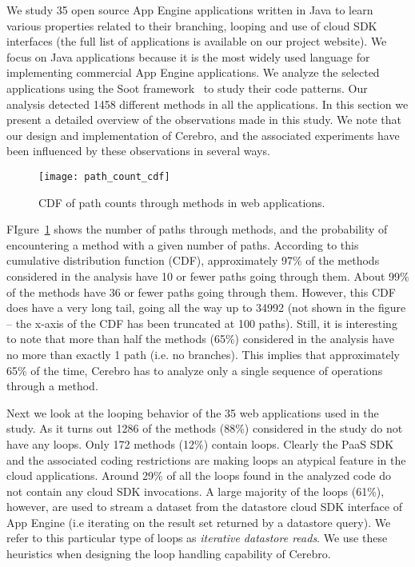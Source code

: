 We study 35 open source App Engine applications written in Java to learn 
various properties related to their branching, looping and use of cloud SDK interfaces (the full list
of applications is available on our project website). We focus on
Java applications because it is the most widely used language for implementing
commercial App Engine applications. 
We analyze the selected applications
using the Soot framework~\cite{Vallee-Rai:2010:SJB:1925805.1925818} to study their code patterns. 
Our analysis detected 1458 different methods in all the
applications. In this section we present a detailed overview of the observations made in this study. We note that
our design and implementation of Cerebro, and the associated experiments have been influenced by 
these observations in several ways.

\begin{figure}
\centering
\texttt{[image: path\_count\_cdf]}
\caption{CDF of path counts through methods in web applications.}
\label{fig:path_count_cdf}
\end{figure}

FIgure~\ref{fig:path_count_cdf} shows the number of paths through methods, and the probability of encountering
a method with a given number of paths. According to this cumulative distribution function (CDF), 
approximately 97\% of the methods considered in the analysis have 10 or fewer paths going through them. About 99\% of 
the methods have 36 or fewer paths going through them. However, this CDF does have a very long tail, going all the way
up to 34992 (not shown in the figure -- the x-axis of the CDF has been truncated at 100 paths). Still, it is interesting to note that more
than half the methods (65\%) considered in the analysis have no more than exactly 1 path (i.e. no branches).
This implies that approximately 65\% of the time, Cerebro has to analyze only a single sequence of operations through a method. 

Next we look at the looping behavior of the 35 web applications used in the study. As it turns out 1286 of the methods (88\%)
considered in the study
do not have any loops. Only 172 methods (12\%) contain loops. Clearly the PaaS SDK and the associated coding restrictions
are making loops an atypical feature in the cloud applications. Around 29\% of all the loops found in 
the analyzed code do not contain any cloud SDK invocations. A large majority of the loops (61\%), however, are
used to stream a dataset from the datastore cloud SDK interface of App Engine (i.e iterating on the result set 
returned by a datastore query). We refer to this particular type of loops as \textit{iterative datastore reads}. 
We use these heuristics when designing the loop handling capability of Cerebro.

